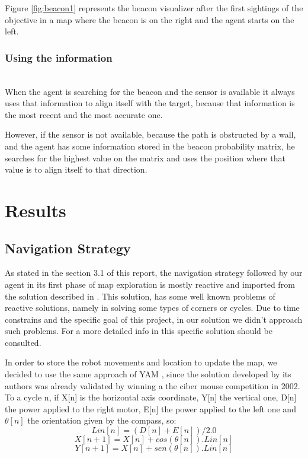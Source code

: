 \documentclass[oribibl]{llncs}
\begin{document}
Figure \ref{fig:beacon1} represents the beacon visualizer after the first sightings
of the objective in a map where the beacon is on the right and the agent starts
on the left.

\subsubsection{Using the information}\hfill \\

When the agent is searching for the beacon and the sensor is available it always
uses that information to align itself with the target, because that information is the
most recent and the most accurate one.

However, if the sensor is not available, because the path is obstructed by a wall,
and the agent has some information stored in the beacon probability matrix, he searches for
the highest value on the matrix and uses the position where that value is to align
itself to that direction.

\section{Results}

\subsection{Navigation Strategy}
As stated in the section 3.1 of this report, the navigation strategy followed by our agent in its first phase of map exploration is mostly reactive and imported from the solution described in \cite{Moreira2012}. This solution, has some well known problems of reactive solutions, namely in solving some types of corners or cycles. Due to time constrains and the specific goal of this project, in our solution we didn't approach such problems. For a more detailed info in this specific solution \cite{Moreira2012} should be consulted.

In order to store the robot movements and location to update the map, we decided to use the same approach of YAM \cite{Ribeiro2002}, since the solution developed by its authors was already validated by winning a the ciber mouse competition in 2002. 
To a cycle n, if X[n] is the horizontal axis coordinate, Y[n] the vertical one, D[n] the power applied to the right motor, E[n] the power applied to the left one and $\theta[n]$ the orientation given by the compass, so:
\begin{equation}
Lin[n] = (D[n] + E[n]) / 2.0
\end{equation}
\begin{equation}
X[n+1] = X[n] + cos(θ[n]).Lin[n]
\end{equation}
\begin{equation}
Y[n+1] = X[n] + sen(θ[n]).Lin[n]
\end{equation}
\end{document}
